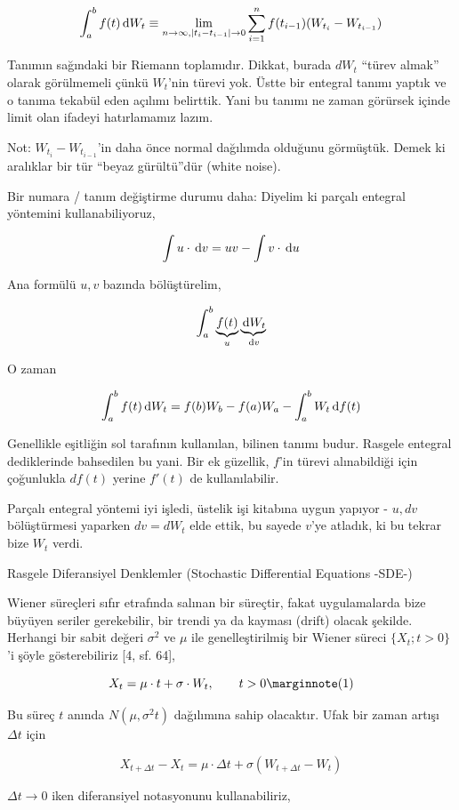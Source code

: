 \documentclass[12pt,fleqn]{article}\usepackage{../../common}
\begin{document}
$$
\int_{ a}^{b} f(t) \,\mathrm{d} W_t \equiv  
\lim_{ n \to \infty, |t_i-t_{i-1}| \to 0 }
\sum _{i=1}^{n} f(t_{i-1}) ( W_{t_i} - W_{t_{i-1}})
$$

Tanımın sağındaki bir Riemann toplamıdır. Dikkat, burada $dW_t$ ``türev almak''
olarak görülmemeli çünkü $W_t$'nin türevi yok. Üstte bir entegral tanımı yaptık
ve o tanıma tekabül eden açılımı belirttik. Yani bu tanımı ne zaman görürsek
içinde limit olan ifadeyi hatırlamamız lazım.

Not: $W_{t_i} - W_{t_{i-1}}$'in daha önce normal dağılımda olduğunu
görmüştük. Demek ki aralıklar bir tür ``beyaz gürültü''dür (white noise).

Bir numara / tanım değiştirme durumu daha: Diyelim ki parçalı entegral yöntemini
kullanabiliyoruz,

$$ \int u \cdot \,\mathrm{d} v = uv - \int v \cdot \,\mathrm{d} u $$

Ana formülü $u,v$ bazında bölüştürelim,

$$ \int _{a}^{b} \underbrace{f(t)}_{u}\underbrace{\,\mathrm{d} W_t}_{\,\mathrm{d} v}$$

O zaman 

$$ \int _{a}^{b} f(t)\,\mathrm{d} W_t = f(b)W_b - f(a)W_a - \int _{a}^{b} W_t \,\mathrm{d} f(t) $$

Genellikle eşitliğin sol tarafının kullanılan, bilinen tanımı budur. Rasgele
entegral dediklerinde bahsedilen bu yani. Bir ek güzellik, $f$'in türevi
alınabildiği için çoğunlukla $df(t)$ yerine $f'(t)$ de kullanılabilir.

Parçalı entegral yöntemi iyi işledi, üstelik işi kitabına uygun yapıyor - $u,dv$
bölüştürmesi yaparken $dv=dW_t$ elde ettik, bu sayede $v$'ye atladık, ki bu
tekrar bize $W_t$ verdi.

Rasgele Diferansiyel Denklemler (Stochastic Differential Equations -SDE-)

Wiener süreçleri sıfır etrafında salınan bir süreçtir, fakat uygulamalarda bize
büyüyen seriler gerekebilir, bir trendi ya da kayması (drift) olacak
şekilde. Herhangi bir sabit değeri $\sigma^2$ ve $\mu$ ile genelleştirilmiş bir
Wiener süreci $\{ X_t; t>0\}$'i şöyle gösterebiliriz [4, sf. 64],

$$ 
X_t = \mu \cdot t + \sigma \cdot W_t, \qquad t>0 
\mlabel{1}
$$

Bu süreç $t$ anında $N(\mu,\sigma^2t)$ dağılımına sahip olacaktır. Ufak bir
zaman artışı $\Delta t$ için

$$ X_{t + \Delta t} - X_t = \mu \cdot \Delta t + \sigma (W_{t+\Delta t}-W_t)$$

$\Delta t \to 0$ iken diferansiyel notasyonunu kullanabiliriz, 
\end{document}
